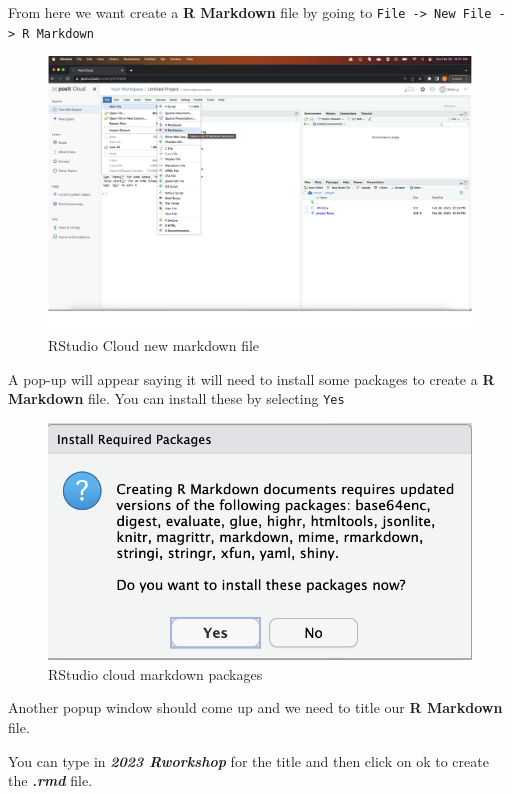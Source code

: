 \documentclass[
]{book}
\begin{document}
From here we want create a \textbf{R Markdown} file by going to \texttt{File\ -\textgreater{}\ New\ File\ -\textgreater{}\ R\ Markdown}

\begin{figure}
\includegraphics[width=50in]{images/2.8rmarkdowncloudnew} \caption{RStudio Cloud new markdown file}\label{fig:unnamed-chunk-9}
\end{figure}

A pop-up will appear saying it will need to install some packages to create a \textbf{R Markdown} file. You can install these by selecting \texttt{Yes}

\begin{figure}
\includegraphics[width=10.33in]{images/2.9rmarkdownpackages} \caption{RStudio cloud markdown packages}\label{fig:unnamed-chunk-10}
\end{figure}

Another popup window should come up and we need to title our \textbf{R Markdown} file.

You can type in \textbf{\emph{2023 Rworkshop}} for the title and then click on ok to create the \textbf{\emph{.rmd}} file.
\end{document}
